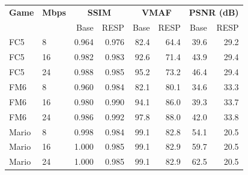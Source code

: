 \begin{tabular}{@{}llrrrrrr@{}}
\toprule
\textbf{Game} & \textbf{Mbps} & \multicolumn{2}{c}{\textbf{SSIM}} & \multicolumn{2}{c}{\textbf{VMAF}} & \multicolumn{2}{c}{\textbf{PSNR (dB)}} \\
 & & Base & RESP & Base & RESP & Base & RESP \\
\midrule
FC5 & 8 & 0.964 & 0.976 & 82.4 & 64.4 & 39.6 & 29.2 \\
FC5 & 16 & 0.982 & 0.983 & 92.6 & 71.4 & 43.9 & 29.4 \\
FC5 & 24 & 0.988 & 0.985 & 95.2 & 73.2 & 46.4 & 29.4 \\
\midrule
FM6 & 8 & 0.960 & 0.984 & 82.1 & 80.1 & 34.6 & 33.3 \\
FM6 & 16 & 0.980 & 0.990 & 94.1 & 86.0 & 39.3 & 33.7 \\
FM6 & 24 & 0.986 & 0.992 & 97.8 & 88.0 & 42.0 & 33.8 \\
\midrule
Mario & 8 & 0.998 & 0.984 & 99.1 & 82.8 & 54.1 & 20.5 \\
Mario & 16 & 1.000 & 0.985 & 99.1 & 82.9 & 59.7 & 20.5 \\
Mario & 24 & 1.000 & 0.985 & 99.1 & 82.9 & 62.5 & 20.5 \\
\bottomrule
\end{tabular}

